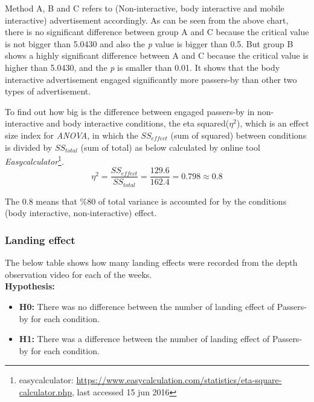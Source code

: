 Method A, B and C refers to (Non-interactive, body interactive and mobile interactive) advertisement accordingly. As can be seen from the above chart, there is no significant difference between group A and C because the critical value is not bigger than 5.0430 and also the \emph{p} value is bigger than 0.5. But group B shows a highly significant difference between A and C because the critical value is higher than 5.0430, and the \emph{p} is smaller than 0.01. It shows that the body interactive advertisement engaged significantly more passers-by than other two types of advertisement.

To find out how big is the difference between engaged passers-by in non-interactive and body interactive conditions, the eta squared(${\eta}^2$), which is an effect size index for \emph{ANOVA}, in which the $SS_{effect}$ (sum of squared) between conditions is divided by $SS_{total}$  (sum of total) as below calculated by online tool \emph{Easycalculator}\footnote{easycalculator: \url{https://www.easycalculation.com/statistics/eta-square-calculator.php}, last accessed 15 jun 2016}.
\[
{\eta}^2 = \frac{{SS}_{effect}}{{SS}_{total}} = \frac{129.6}{162.4} = 0.798 \approx 0.8
\]

The 0.8 means that \%80 of total variance is accounted for by the conditions (body interactive, non-interactive) effect. 


\subsubsection {Landing effect}
The below table shows how many landing effects were recorded from the depth observation video for each of the weeks.\\


\textbf{Hypothesis: }
\begin{itemize}
\item \textbf{H0:} There was no difference between the number of landing effect of Passers-by for each condition.
\item \textbf{H1:} There was a difference between the number of landing effect of Passers-by for each condition.
\end{itemize}

\begin{table}[H]
\caption{Number of Landing effect in three weeks}
\label{tab:landingeffectthreeweeks}
\centering
{}
\end{table}


